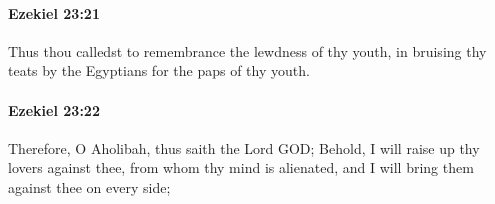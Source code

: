		\paragraph{Ezekiel 23:21} %
			\label{EZEKIEL-23-21}

			Thus thou calledst to remembrance the lewdness of thy youth, in bruising thy teats by the Egyptians for the paps of thy youth.


		\paragraph{Ezekiel 23:22} %
			\label{EZEKIEL-23-22}

			Therefore, O Aholibah, thus saith the Lord GOD; Behold, I will raise up thy lovers against thee, from whom thy mind is alienated, and I will bring them against thee on every side;



